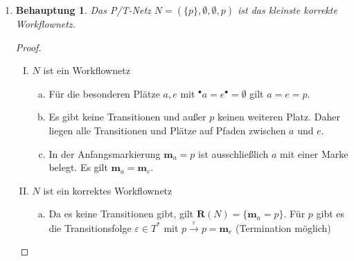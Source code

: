 \documentclass[a4paper]{scrartcl}
\newtheorem*{behaupt}{Behauptung}
\begin{document}
\begin{enumerate}
\begin{proof}
\begin{enumerate}[I.]
                    TODO:

            \end{enumerate}
        \end{proof}

    \item
        \begin{behaupt}
            Das P/T-Netz $N = ( \{ p \}, \emptyset, \emptyset, p)$ ist das
            kleinste korrekte Workflownetz.
        \end{behaupt}
        \begin{proof} \hfill \\
            \begin{enumerate}[I.]
                \item $N$ ist ein Workflownetz
                    \begin{enumerate}[a)]
                        \item
                            Für die besonderen Plätze $a, e$ mit
                            $^\bullet a = e^\bullet = \emptyset$
                            gilt $a = e = p$.

                        \item
                            Es gibt keine Transitionen und außer $p$ keinen
                            weiteren Platz.
                            Daher liegen alle Transitionen und Plätze auf
                            Pfaden zwischen $a$ und $e$.

                        \item
                            In der Anfangsmarkierung $\textbf{m}_a = p$ ist
                            ausschließlich $a$ mit einer Marke belegt.
                            Es gilt $\textbf{m}_a = \textbf{m}_e$.

                    \end{enumerate}

                \item $N$ ist ein korrektes Workflownetz
                    \begin{enumerate}[a)]
                        \item
                            Da es keine Transitionen gibt, gilt
                            $\textbf{R}(N) = \{ \textbf{m}_a = p \}$.
                            Für $p$ gibt es die Transitionsfolge
                            $\varepsilon \in T^*$ mit
                            $p \stackrel{\varepsilon}{\to} p = \textbf{m}_e$
                            (Termination möglich)


\end{enumerate}
\end{enumerate}
\end{proof}
\end{enumerate}
\end{document}
